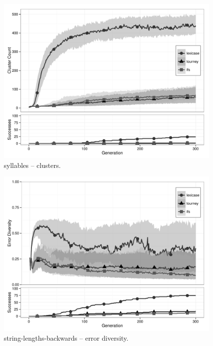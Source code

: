 \begin{figure}%
\centering
\includegraphics[width=11.5cm]{syllables-cluster.pdf}
\caption{syllables -- clusters.}
\label{syllablesClu}
\end{figure}

\begin{figure}%
\centering
\includegraphics[width=11.5cm]{string-lengths-backwards-diversity.pdf}
\caption{string-lengths-backwards -- error diversity.}
\label{string-lengths-backwardsDiv}
\end{figure}


